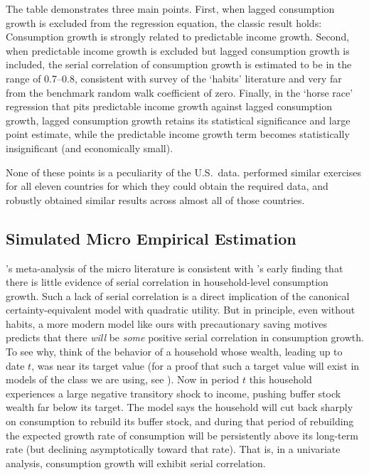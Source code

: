 \documentclass[titlepage]{\econtex}\newcommand{\texname}{cAndCwithStickyE}
\begin{document}
The table demonstrates three main points.  First, when lagged consumption growth is excluded from the regression equation, the classic \cite{cmModel} result holds: Consumption growth is strongly related to predictable income growth.  Second, when predictable income growth is excluded but lagged consumption growth is included, the serial correlation of consumption growth is estimated to be in the range of 0.7--0.8, consistent with \cite{hrsHabit} survey of the `habits' literature and very far from the benchmark random walk coefficient of zero.  Finally, in the `horse race' regression that pits predictable income growth against lagged consumption growth, lagged consumption growth retains its statistical significance and large point estimate, while the predictable income growth term becomes statistically insignificant (and economically small).

None of these points is a peculiarity of the U.S.\ data.  \cite{cssIntlStickyC} performed similar exercises for all eleven countries for which they could obtain the required data, and robustly obtained similar results across almost all of those countries.


\subsection{Simulated Micro Empirical Estimation} \label{subsec:simMicro}

\cite{hrsHabit}'s meta-analysis of the micro literature is consistent with \cite{dynanHabits}'s early finding that there is little evidence of serial correlation in household-level consumption growth.  Such a lack of serial correlation is a direct implication of the canonical \cite{hallRandomWalk} certainty-equivalent model with quadratic utility.  But in principle, even without habits, a more modern model like ours with precautionary saving motives predicts that there {\it will} be {\it some} positive serial correlation in consumption growth.  To see why, think of the behavior of a household whose wealth, leading up to date $t$, was near its target value (for a proof that such a target value will exist in models of the class we are using, see \cite{BufferStockTheory}).  Now in period $t$ this household experiences a large negative transitory shock to income, pushing buffer stock wealth far below its target.  The model says the household will cut back sharply on consumption to rebuild its buffer stock, and during that period of rebuilding the expected growth rate of consumption will be persistently above its long-term rate (but declining asymptotically toward that rate).  That is, in a univariate analysis, consumption growth will exhibit serial correlation.
\end{document}
